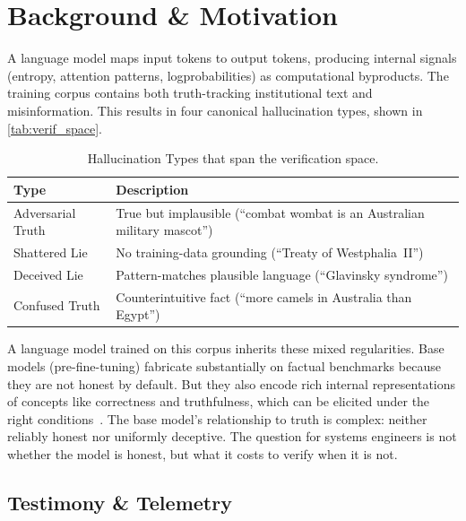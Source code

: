 \section{Background \& Motivation}\label{sec:background}

A language model maps input tokens to output tokens, producing
internal signals (entropy, attention patterns, log\-probabilities)
as computational byproducts. The training corpus contains both
truth-tracking institutional text and misinformation.
This results in four canonical hallucination types, shown in \autoref{tab:verif_space}.

\begin{table}[t]
\begin{tabular}{@{}lp{}@{}}
\toprule
\textbf{Type} & \textbf{Description} \\
\midrule
Adversarial Truth & True but implausible (``combat wombat is an Australian military mascot'') \\
Shattered Lie & No training-data grounding (``Treaty of Westphalia~II'') \\
Deceived Lie & Pattern-matches plausible language (``Glavinsky syndrome'') \\
Confused Truth & Counterintuitive fact (``more camels in Australia than Egypt'') \\
\bottomrule
\end{tabular}
\caption{Hallucination Types that span the verification space.}
\label{tab:verif_space}
\end{table}

A language model trained on this corpus inherits these mixed regularities.
Base models (pre-fine-tuning)
fabricate substantially on factual benchmarks because they are not honest by
default. But they also encode rich internal representations of concepts like
correctness and truthfulness, which can be elicited under the right conditions~\cite{burns2023discovering}.
The base model's relationship to truth is complex: neither reliably honest nor
uniformly deceptive. The question for systems engineers is not whether the
model is honest, but what it costs to verify when it is not.

\subsection{Testimony \& Telemetry}

